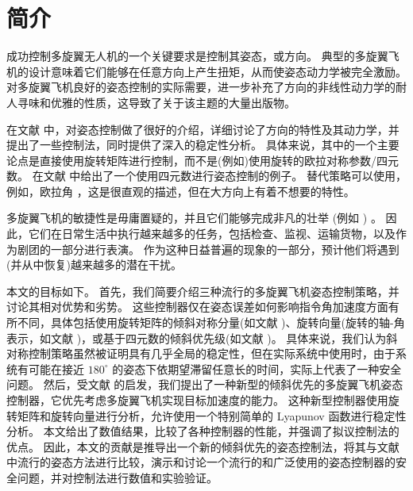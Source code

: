 \section{简介}
\label{secIntro}

成功控制多旋翼无人机的一个关键要求是控制其姿态，或方向。
典型的多旋翼飞机的设计意味着它们能够在任意方向上产生扭矩，从而使姿态动力学被完全激励。
对多旋翼飞机良好的姿态控制的实际需要，进一步补充了方向的非线性动力学的耐人寻味和优雅的性质，这导致了关于该主题的大量出版物。

在文献 \cite{chaturvedi2011rigid} 中，对姿态控制做了很好的介绍，详细讨论了方向的特性及其动力学，并提出了一些控制法，同时提供了深入的稳定性分析。
具体来说，其中的一个主要论点是直接使用旋转矩阵进行控制，而不是(例如)使用旋转的欧拉对称参数/四元数。
在文献 \cite{fresk2013full} 中给出了一个使用四元数进行姿态控制的例子。
替代策略可以使用，例如，欧拉角 \cite{lupashin2014platform}，这是很直观的描述，但在大方向上有着不想要的特性。

多旋翼飞机的敏捷性是毋庸置疑的，并且它们能够完成非凡的壮举 (例如 \cite{mueller2011quadrocopter,mellinger2012trajectory,ritz2012cooperative,mueller2015relaxed,falanga2017aggressive}) 。
因此，它们在日常生活中执行越来越多的任务，包括检查、监视、运输货物，以及作为剧团的一部分进行表演。
作为这种日益普遍的现象的一部分，预计他们将遇到(并从中恢复)越来越多的潜在干扰。

本文的目标如下。
首先，我们简要介绍三种流行的多旋翼飞机姿态控制策略，并讨论其相对优势和劣势。
这些控制器仅在姿态误差如何影响指令角加速度方面有所不同，具体包括使用旋转矩阵的倾斜对称分量(如文献 \cite{lee2010geometric})、旋转向量(旋转的轴-角表示，如文献 \cite{bullo1995proportional,yu2015high})，或基于四元数的倾斜优先级(如文献 \cite{brescianini2013nonlinear})。
具体来说，我们认为斜对称控制策略虽然被证明具有几乎全局的稳定性，但在实际系统中使用时，由于系统有可能在接近 $180^\circ$ 的姿态下依期望滞留任意长的时间，实际上代表了一种安全问题。
然后，受文献 \cite{brescianini2013nonlinear} 的启发，我们提出了一种新型的倾斜优先的多旋翼飞机姿态控制器，它优先考虑多旋翼飞机实现目标加速度的能力。
这种新型控制器使用旋转矩阵和旋转向量进行分析，允许使用一个特别简单的 Lyapunov 函数进行稳定性分析。 
本文给出了数值结果，比较了各种控制器的性能，并强调了拟议控制法的优点。
因此，本文的贡献是推导出一个新的倾斜优先的姿态控制法，将其与文献中流行的姿态方法进行比较，演示和讨论一个流行的和广泛使用的姿态控制器的安全问题，并对控制法进行数值和实验验证。

